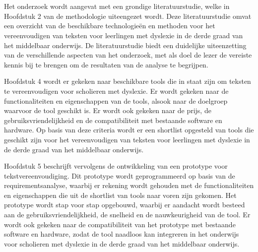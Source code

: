 
\chapter{}%
\label{ch:methodologie}


Het onderzoek wordt aangevat met een grondige literatuurstudie, welke in Hoofdstuk 2 van de methodologie uiteengezet wordt. Deze literatuurstudie omvat een overzicht van de beschikbare technologieën en methoden voor het vereenvoudigen van teksten voor leerlingen met dyslexie in de derde graad van het middelbaar onderwijs. De literatuurstudie biedt een duidelijke uiteenzetting van de verschillende aspecten van het onderzoek, met als doel de lezer de vereiste kennis bij te brengen om de resultaten van de analyse te begrijpen.

Hoofdstuk 4 wordt er gekeken naar beschikbare tools die in staat zijn om teksten te vereenvoudigen voor scholieren met dyslexie. Er wordt gekeken naar de functionaliteiten en eigenschappen van de tools, alsook naar de doelgroep waarvoor de tool geschikt is. Er wordt ook gekeken naar de prijs, de gebruiksvriendelijkheid en de compatibiliteit met bestaande software en hardware. Op basis van deze criteria wordt er een shortlist opgesteld van tools die geschikt zijn voor het vereenvoudigen van teksten voor leerlingen met dyslexie in de derde graad van het middelbaar onderwijs.

Hoofdstuk 5 beschrijft vervolgens de ontwikkeling van een prototype voor tekstvereenvoudiging. Dit prototype wordt geprogrammeerd op basis van de requirementsanalyse, waarbij er rekening wordt gehouden met de functionaliteiten en eigenschappen die uit de shortlist van tools naar voren zijn gekomen. Het prototype wordt stap voor stap opgebouwd, waarbij er aandacht wordt besteed aan de gebruiksvriendelijkheid, de snelheid en de nauwkeurigheid van de tool. Er wordt ook gekeken naar de compatibiliteit van het prototype met bestaande software en hardware, zodat de tool naadloos kan integreren in het onderwijs voor scholieren met dyslexie in de derde graad van het middelbaar onderwijs.

